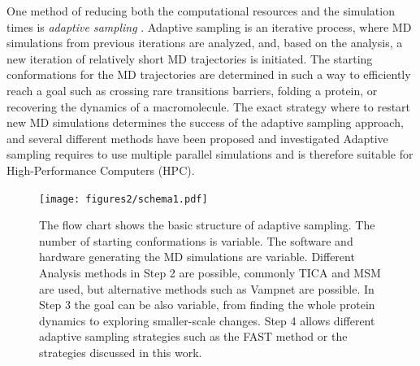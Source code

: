 One method of reducing both the computational resources and the simulation times is \emph{adaptive sampling} \cite{singhal2005error, bowman2010enhanced,
weber2011characterization, Fabritiis-2014, preto2014fast, doerr2016htmd,
AdaptivePELE-Lecina2017, EvolutionCoupling-Shamsi2017, FAST-Bowman-2015, 
Strategies-erros-reduce, plattner2017complete, Adstrategies2018}. 
Adaptive sampling is an iterative process, where MD simulations from previous
iterations are analyzed, and, based on the analysis, a new iteration of relatively
short MD trajectories is initiated. The starting conformations for the
MD trajectories are determined in such a way to efficiently
reach a goal such as crossing rare transitions barriers, folding a protein, or
recovering the dynamics of a macromolecule. The exact strategy where to restart
new MD simulations determines the success of the adaptive sampling approach,
and several different methods have been proposed and investigated Adaptive sampling
requires to use multiple parallel simulations and is therefore suitable for
High-Performance Computers (HPC).

\begin{figure}[h]
  \centering
  \texttt{[image: figures2/schema1.pdf]}
  \caption{The flow chart shows the basic structure of adaptive sampling. The
  number of starting conformations is variable. The software and hardware
  generating the MD simulations are variable. Different Analysis methods in Step 2
  are possible, commonly TICA \cite{TICA1-perez2013, TICA2-schwantes2013} and
  MSM \cite{prinz2011markov} are used, but alternative methods such as Vampnet \cite{Mardt2018}
  are possible. In Step 3 the goal can be also variable, from finding the whole protein
  dynamics to exploring smaller-scale changes. Step 4 allows different adaptive
  sampling strategies such as the FAST method \cite{FAST} or the strategies
  discussed in this work.}
  \label{fig:schema}
\end{figure}


